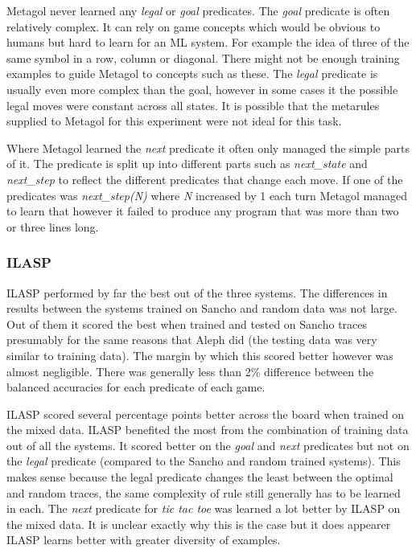 Metagol never learned any \textit{legal} or \textit{goal} predicates. The \textit{goal} predicate is often relatively complex. It can rely on game concepts which would be obvious to humans but hard to learn for an ML system. For example the idea of three of the same symbol in a row, column or diagonal. There might not be enough training examples to guide Metagol to concepts such as these. The \textit{legal} predicate is usually even more complex than the goal, however in some cases it the possible legal moves were constant across all states. It is possible that the metarules supplied to Metagol for this experiment were not ideal for this task.

Where Metagol learned the \textit{next} predicate it often only managed the simple parts of it. The predicate is split up into different parts such as \textit{next\_state} and \textit{next\_step} to reflect the different predicates that change each move. If one of the predicates was \textit{next\_step(N)} where \textit{N} increased by 1 each turn Metagol managed to learn that however it failed to produce any program that was more than two or three lines long.

\subsubsection{ILASP}
ILASP performed by far the best out of the three systems. The differences in results between the systems trained on Sancho and random data was not large. Out of them it scored the best when trained and tested on Sancho traces presumably for the same reasons that Aleph did (the testing data was very similar to training data). The margin by which this scored better however was almost negligible. There was generally less than 2\% difference between the balanced accuracies for each predicate of each game.

ILASP scored several percentage points better across the board when trained on the mixed data. ILASP benefited the most from the combination of training data out of all the systems. It scored better on the \textit{goal} and \textit{next} predicates but not on the \textit{legal} predicate (compared to the Sancho and random trained systems). This makes sense because the legal predicate changes the least between the optimal and random traces, the same complexity of rule still generally has to be learned in each. The \textit{next} predicate for \textit{tic tac toe} was learned a lot better by ILASP on the mixed data. It is unclear exactly why this is the case but it does appearer ILASP learns better with greater diversity of examples. 


